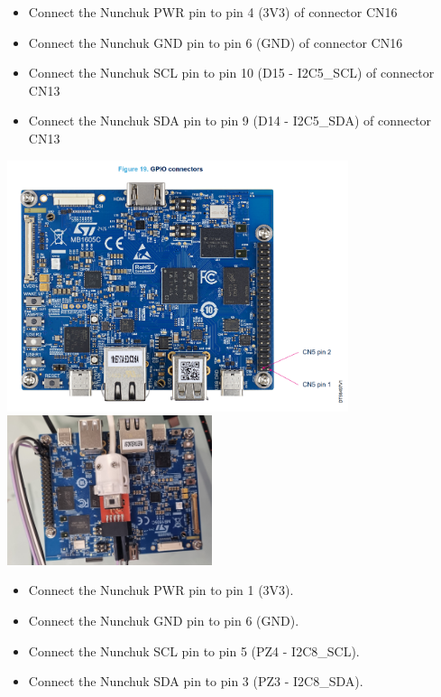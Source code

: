 \begin{itemize}
\item Connect the Nunchuk PWR pin to pin 4 (3V3) of connector CN16
\item Connect the Nunchuk GND pin to pin 6 (GND) of connector CN16
\item Connect the Nunchuk SCL pin to pin 10 (D15 - I2C5\_SCL) of connector CN13
\item Connect the Nunchuk SDA pin to pin 9 (D14 - I2C5\_SDA) of connector CN13
\end{itemize}
\fi
\if{}
\begin{center}
  \includegraphics[width=10cm]{labs/sysdev-accessing-hardware-stm32/stm32mp2_pin_map.png}
  \includegraphics[width=6cm]{labs/sysdev-accessing-hardware-stm32/stm32mp2_nunchuk.jpg}
\end{center}

\begin{itemize}
\item Connect the Nunchuk PWR pin to pin 1 (3V3).
\item Connect the Nunchuk GND pin to pin 6 (GND).
\item Connect the Nunchuk SCL pin to pin 5 (PZ4 - I2C8\_SCL).
\item Connect the Nunchuk SDA pin to pin 3 (PZ3 - I2C8\_SDA).
\end{itemize}
\fi

